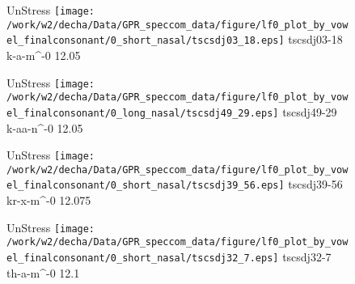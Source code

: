 \documentclass{article}
\begin{document}
\begin{figure}[t]
\begin{minipage}[b]{.24\textwidth}
UnStress
\centering
\texttt{[image: /work/w2/decha/Data/GPR\_speccom\_data/figure/lf0\_plot\_by\_vowel\_finalconsonant/0\_short\_nasal/tscsdj03\_18.eps]}
tscsdj03-18 k-a-m\textasciicircum-0 12.05
\end{minipage}
\begin{minipage}[b]{.24\textwidth}
UnStress
\centering
\texttt{[image: /work/w2/decha/Data/GPR\_speccom\_data/figure/lf0\_plot\_by\_vowel\_finalconsonant/0\_long\_nasal/tscsdj49\_29.eps]}
tscsdj49-29 k-aa-n\textasciicircum-0 12.05
\end{minipage}
\begin{minipage}[b]{.24\textwidth}
UnStress
\centering
\texttt{[image: /work/w2/decha/Data/GPR\_speccom\_data/figure/lf0\_plot\_by\_vowel\_finalconsonant/0\_short\_nasal/tscsdj39\_56.eps]}
tscsdj39-56 kr-x-m\textasciicircum-0 12.075
\end{minipage}
\begin{minipage}[b]{.24\textwidth}
UnStress
\centering
\texttt{[image: /work/w2/decha/Data/GPR\_speccom\_data/figure/lf0\_plot\_by\_vowel\_finalconsonant/0\_short\_nasal/tscsdj32\_7.eps]}
tscsdj32-7 th-a-m\textasciicircum-0 12.1
\end{minipage}
\end{figure}
\end{document}
